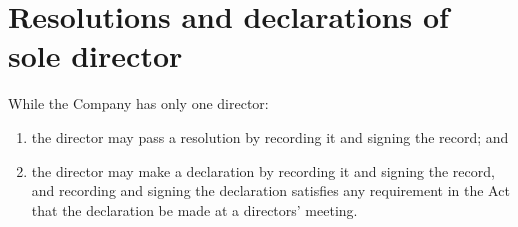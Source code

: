 \section{Resolutions and declarations of sole director}

While the Company has only one director:

\begin{enumerate}[label=(\alph*)]
    \item the director may pass a resolution by recording it and signing the record; and
    
    \item the director may make a declaration by recording it and signing the record, and recording and signing the declaration satisfies any requirement in the Act that the declaration be made at a directors' meeting.
\end{enumerate} 